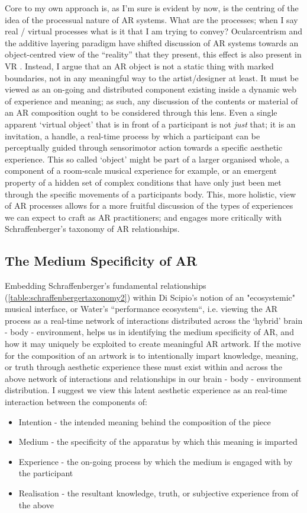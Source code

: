 Core to my own approach is, as I’m sure is evident by now, is the centring of the idea of the processual nature of AR systems. What are the processes; when I say real / virtual processes what is it that I am trying to convey? Ocularcentrism and the additive layering paradigm have shifted discussion of AR systems towards an object-centred view of the “reality” that they present, this effect is also present in VR \citep[]{hovhannisyan2019}. Instead, I argue that an AR object is not a static thing with marked boundaries, not in any meaningful way to the artist/designer at least. It must be viewed as an on-going and distributed component existing inside a dynamic web of experience and meaning; as such, any discussion of the contents or material of an AR composition ought to be considered through this lens. Even a single apparent ‘virtual object’ that is in front of a participant is not \textit{just} that; it is an invitation, a handle, a real-time process by which a participant can be perceptually guided through sensorimotor action towards a specific aesthetic experience. This so called ‘object’ might be part of a larger organised whole, a component of a room-scale musical experience for example, or an emergent property of a hidden set of complex conditions that have only just been met through the specific movements of a participants body. This, more holistic, view of AR processes allows for a more fruitful discussion of the types of experiences we can expect to craft as AR practitioners; and engages more critically with Schraffenberger’s taxonomy of AR relationships.

\subsection{The Medium Specificity of AR}
Embedding Schraffenberger’s fundamental relationships (\autoref{table:schraffenbergertaxonomy2}) within Di Scipio’s notion of an "ecosystemic" musical interface, or Water’s “performance ecosystem“, i.e. viewing the AR process as a real-time network of interactions distributed across the ‘hybrid’ brain - body - environment, helps us in identifying the medium specificity of AR, and how it may uniquely be exploited to create meaningful AR artwork. If the motive for the composition of an artwork is to intentionally impart knowledge, meaning, or truth through aesthetic experience these must exist within and across the above network of interactions and relationships in our brain - body - environment distribution. I suggest we view this latent aesthetic experience as an real-time interaction between the components of:
\begin{itemize}
    \item Intention - the intended meaning behind the composition of the piece
    \item Medium - the specificity of the apparatus by which this meaning is imparted
    \item Experience - the on-going process by which the medium is engaged with by the participant
    \item Realisation - the resultant knowledge, truth, or subjective experience from of the above
\end{itemize}

